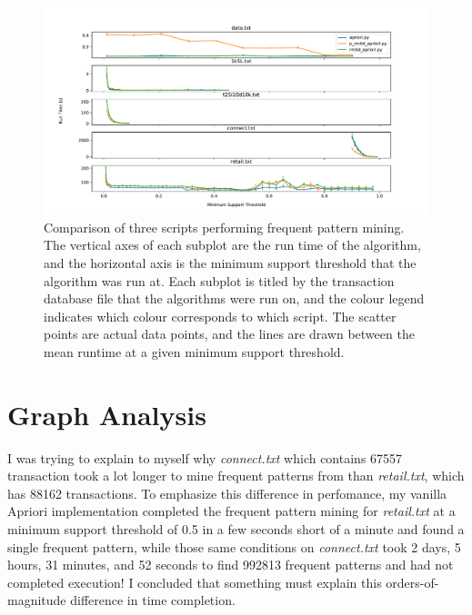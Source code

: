 \documentclass[12 pt]{article}
\begin{document}
\begin{figure}[H]
	\includegraphics[scale=0.5]{minsup_stats}
	\caption{Comparison of three scripts performing frequent pattern mining. The vertical axes of each subplot are the run time of the algorithm, and the horizontal axis is the minimum support threshold that the algorithm was run at. Each subplot is titled by the transaction database file that the algorithms were run on, and the colour legend indicates which colour corresponds to which script. The scatter points are actual data points, and the lines are drawn between the mean runtime at a given minimum support threshold.}
	\label{fig:mtrt}
\end{figure}

\section{Graph Analysis}
\label{section:graph}

I was trying to explain to myself why \textit{connect.txt} which contains 67557 transaction took a lot longer to mine frequent patterns from than \textit{retail.txt}, which has 88162 transactions. To emphasize this difference in perfomance, my vanilla Apriori implementation completed the frequent pattern mining for \textit{retail.txt} at a minimum support threshold of 0.5 in a few seconds short of a minute and found a single frequent pattern, while those same conditions on \textit{connect.txt} took 2 days, 5 hours, 31 minutes, and 52 seconds to find 992813 frequent patterns and had not completed execution! I concluded that something must explain this orders-of-magnitude difference in time completion.\\
\end{document}
